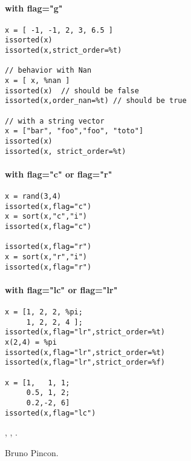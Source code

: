\begin{examples}

\paragraph{with flag="g"}
\begin{Verbatim}
x = [ -1, -1, 2, 3, 6.5 ]
issorted(x)
issorted(x,strict_order=%t)

// behavior with Nan
x = [ x, %nan ]
issorted(x)  // should be false
issorted(x,order_nan=%t) // should be true

// with a string vector
x = ["bar", "foo","foo", "toto"]
issorted(x)
issorted(x, strict_order=%t)
\end{Verbatim}

\paragraph{with flag="c" or  flag="r"}
\begin{Verbatim}
x = rand(3,4)
issorted(x,flag="c")
x = sort(x,"c","i")
issorted(x,flag="c")

issorted(x,flag="r")
x = sort(x,"r","i")
issorted(x,flag="r")
\end{Verbatim}

\paragraph{with flag="lc" or  flag="lr"}
\begin{Verbatim}
x = [1, 2, 2, %pi;
     1, 2, 2, 4 ];
issorted(x,flag="lr",strict_order=%t)
x(2,4) = %pi
issorted(x,flag="lr",strict_order=%t)
issorted(x,flag="lr",strict_order=%f)

x = [1,   1, 1;
     0.5, 1, 2;
     0.2,-2, 6]
issorted(x,flag="lc")
\end{Verbatim}

\end{examples}

\begin{manseealso}
  , , .   
\end{manseealso}

\begin{authors}
Bruno Pincon.
\end{authors}
